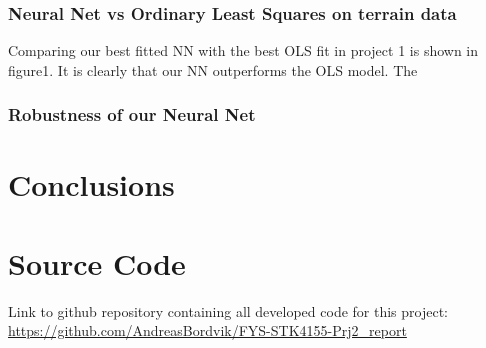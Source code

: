 \documentclass
[twocolumn,
secnumarabic,
nobibnotes,
aps,
prl,
reprint,
groupedaddress,
amsmath,
amssymb
]{revtex4-2}
\begin{document}
\subsubsection{Neural Net vs Ordinary Least Squares on terrain data}
Comparing our best fitted NN with the best OLS fit in project 1 is shown in figure1. It is clearly that our NN outperforms the OLS model. The
\subsubsection{Robustness of our Neural Net}



\section{Conclusions}

\appendix

\section{Source Code}
\label{sec:sc}
Link to github repository containing all developed code for this project: \url{https://github.com/AndreasBordvik/FYS-STK4155-Prj2_report}





\end{document}
